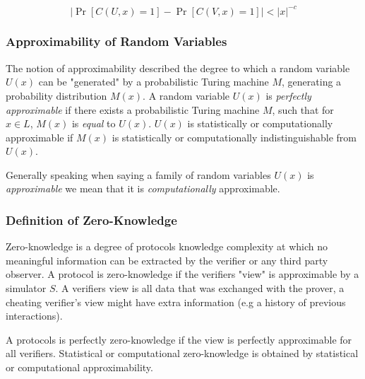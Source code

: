 $$|\Pr[C(U, x) = 1] - \Pr[C(V, x) = 1]|  < |x|^{-c}$$


%
%
%
%
%

\subsubsection{Approximability of Random Variables}%

The notion of approximability described the degree to which a random variable $U(x)$ can be "generated" by a probabilistic Turing machine $M$, generating a probability distribution $M(x)$.
\bigskip
\newline
A random variable $U(x)$ is \textit{perfectly approximable} if there exists a probabilistic Turing machine $M$, such that for $x \in L$, $M(x)$ is \textit{equal} to $U(x)$.
\newline
$U(x)$ is statistically or computationally approximable if $M(x)$ is statistically or computationally indistinguishable from $U(x)$.

\bigskip

Generally speaking when saying a family of random variables $U(x)$ is \textit{approximable} we mean that it is \textit{computationally} approximable.

\subsubsection{Definition of Zero-Knowledge}

Zero-knowledge is a degree of protocols knowledge complexity at which no meaningful information can be extracted by the verifier or any third party observer.
\bigskip
\newline
A protocol is zero-knowledge if the verifiers "view" is approximable by a simulator $S$.
A verifiers view is all data that was exchanged with the prover, a cheating verifier's view might have extra information (e.g a history of previous interactions).

A protocols is perfectly zero-knowledge if the view is perfectly approximable for all verifiers.
Statistical or computational zero-knowledge is obtained by statistical or computational approximability.